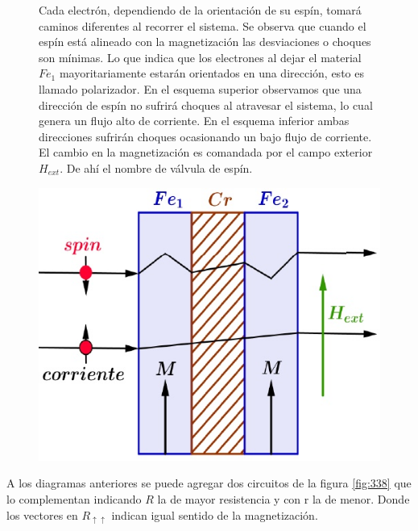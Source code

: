 \begin{figure}[H]
  \begin{minipage}[b]{0.47\textwidth}
Cada electrón, dependiendo de la orientación de su espín, tomará caminos diferentes al recorrer el sistema. Se observa que cuando el espín está alineado con la magnetización las desviaciones o choques son mínimas. Lo que indica que los electrones al dejar el material $Fe_{1}$ mayoritariamente estarán orientados en una dirección, esto es llamado polarizador. En el esquema superior observamos que una dirección de espín no sufrirá choques al atravesar el sistema, lo cual genera un flujo alto de corriente. En el esquema inferior ambas direcciones sufrirán choques ocasionando un bajo flujo de corriente. El cambio en la magnetización es comandada por el campo exterior $H_{ext}$. De ahí el nombre de válvula de espín.
  \vspace{0cm}
  \end{minipage}
  \hfill
  \begin{minipage}[b]{0.47\textwidth}
     \includegraphics[width=1.0\textwidth]{./Figures/fig337}
	\label{fig:337}
	  \vspace{2.5cm}
  \end{minipage}
\end{figure}

A los diagramas anteriores se puede agregar dos circuitos de la figura \ref{fig:338} que lo complementan indicando $R$ la de mayor resistencia y con r la de menor. Donde los vectores en $R_{\uparrow\uparrow}$ indican igual sentido de la magnetización.

